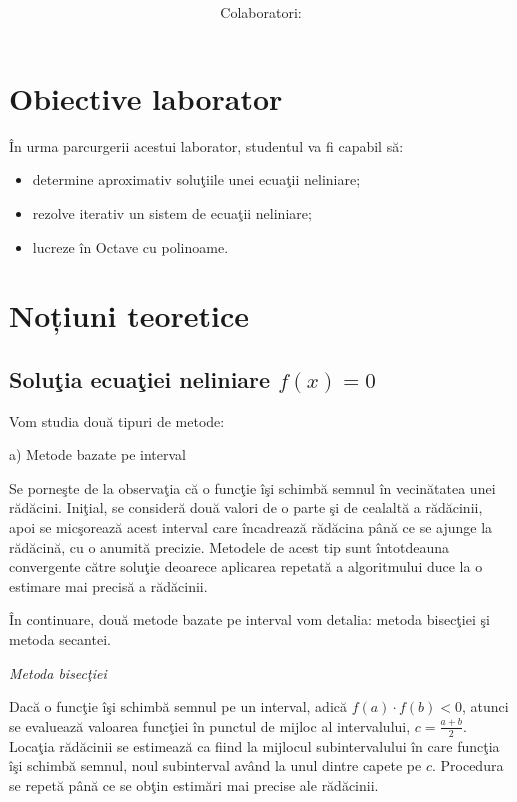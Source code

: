 \documentclass{exam}
\title{
	\textmd{\textbf{\MNLabTitle}}
	\author{Colaboratori: \MNAuthor}
}
\begin{document}
\begin{coverpages}

	\maketitle
	\tableofcontents

\end{coverpages}

\section{Obiective laborator}
În urma parcurgerii acestui laborator, studentul va fi capabil să:
\begin{itemize}
	\item determine aproximativ soluţiile unei ecuaţii neliniare;
	\item rezolve iterativ un sistem de ecuaţii neliniare;
	\item lucreze în Octave cu polinoame.
\end{itemize}

\section{Noțiuni teoretice}

\subsection{Soluţia ecuaţiei neliniare $f(x) = 0$}

Vom studia două tipuri de metode:

a) Metode bazate pe interval

Se porneşte de la observaţia că o funcţie îşi schimbă semnul în vecinătatea unei rădăcini. Iniţial, se consideră două valori de o parte şi de cealaltă a rădăcinii, apoi se micşorează acest interval care încadrează rădăcina până ce se ajunge la rădăcină, cu o anumită precizie. Metodele de acest tip sunt întotdeauna convergente către soluţie deoarece aplicarea repetată a algoritmului duce la o estimare mai precisă a rădăcinii.

În continuare, două metode bazate pe interval vom detalia: metoda bisecţiei şi metoda secantei.

\textit{Metoda bisecţiei}

Dacă o funcţie îşi schimbă semnul pe un interval, adică $f(a)\cdot f(b)<0$, atunci se evaluează valoarea funcţiei în punctul de mijloc al intervalului, $c = \frac{a + b}{2}$. Locaţia rădăcinii se estimează ca fiind la mijlocul subintervalului în care funcţia îşi schimbă semnul, noul subinterval având la unul dintre capete pe $c$. Procedura se repetă până ce se obţin estimări mai precise ale rădăcinii.
\end{document}
